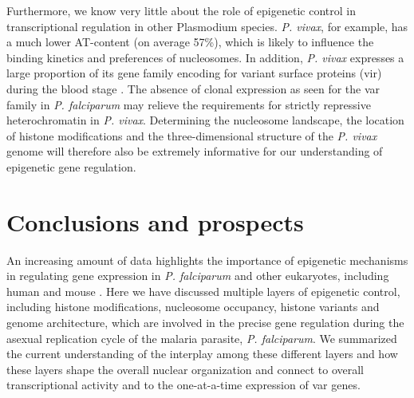 Furthermore, we know very little about the role of epigenetic control in
transcriptional regulation in other Plasmodium species. \textit{P. vivax}, for example,
has a much lower AT-content (on average 57\%), which is likely to influence the
binding kinetics and preferences of nucleosomes. In addition, \textit{P.
vivax}
expresses a large proportion of its gene family encoding for variant surface
proteins (vir) during the blood stage \citep{bozdech:transcriptome,
fernandez-becerra:variant}. The absence of clonal
expression as seen for the var family in \textit{P. falciparum} may relieve the
requirements for strictly repressive heterochromatin in \textit{P. vivax}. Determining
the nucleosome landscape, the location of histone modifications and the
three-dimensional structure of the \textit{P. vivax} genome will therefore also be
extremely informative for our understanding of epigenetic gene regulation.


\section{Conclusions and prospects}
An increasing amount of data highlights the importance of epigenetic
mechanisms in regulating gene expression in \textit{P. falciparum} and other
eukaryotes, including human and mouse \citep{ay:three-dimensional,
dixon:topological, duan:three-dimensional, lemieux:genome-wide,
lieberman-aiden:comprehensive, sexton:three-dimensional}.
Here we have discussed multiple
layers of epigenetic control, including histone modifications, nucleosome
occupancy, histone variants and genome architecture, which are involved in the
precise gene regulation during the asexual replication cycle of the malaria
parasite, \textit{P. falciparum}. We summarized the current understanding of the
interplay among these different layers and how these layers shape the overall
nuclear organization and connect to overall transcriptional activity and to
the one-at-a-time expression of var genes.


